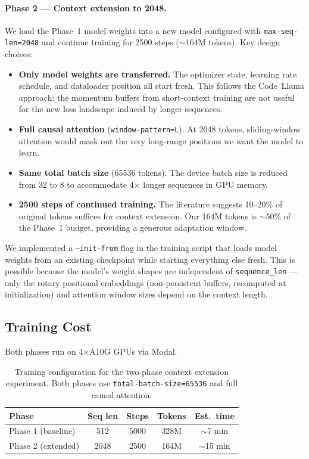 \documentclass[a4paper,12pt]{article}
\begin{document}
\paragraph{Phase 2 — Context extension to 2048.}
We load the Phase~1 model weights into a new model configured with
\texttt{max-seq-len=2048} and continue training for 2500 steps
($\sim$164M tokens).  Key design choices:

\begin{itemize}
    \item \textbf{Only model weights are transferred.}  The optimizer
          state, learning rate schedule, and dataloader position all
          start fresh.  This follows the Code~Llama approach: the
          momentum buffers from short-context training are not useful
          for the new loss landscape induced by longer sequences.
    \item \textbf{Full causal attention} (\texttt{window-pattern=L}).
          At 2048 tokens, sliding-window attention would mask out the
          very long-range positions we want the model to learn.
    \item \textbf{Same total batch size} (65536 tokens).  The
          device batch size is reduced from 32 to 8 to accommodate
          4$\times$ longer sequences in GPU memory.
    \item \textbf{2500 steps of continued training.}  The literature
          suggests 10--20\% of original tokens suffices for context
          extension.  Our 164M tokens is $\sim$50\% of the Phase~1
          budget, providing a generous adaptation window.
\end{itemize}

\noindent We implemented a \texttt{--init-from} flag in the training
script that loads model weights from an existing checkpoint while
starting everything else fresh.  This is possible because the model's
weight shapes are independent of \texttt{sequence\_len} — only the
rotary positional embeddings (non-persistent buffers, recomputed at
initialization) and attention window sizes depend on the context length.

\subsection{Training Cost}

Both phases run on 4$\times$A10G GPUs via Modal.

\begin{table}[H]
\centering
\begin{tabular}{lcccc}
\toprule
\textbf{Phase} & \textbf{Seq len} & \textbf{Steps} & \textbf{Tokens} & \textbf{Est.\ time} \\
\midrule
Phase 1 (baseline) & 512  & 5000 & 328M & $\sim$7 min \\
Phase 2 (extended)  & 2048 & 2500 & 164M & $\sim$15 min \\
\bottomrule
\end{tabular}
\caption{Training configuration for the two-phase context extension experiment.
  Both phases use \texttt{total-batch-size=65536} and full causal attention.}
\end{table}
\end{document}
